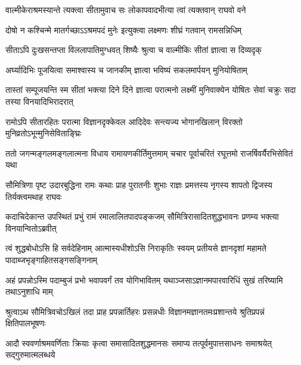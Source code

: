 \twolineshloka
{वाल्मीकेराश्रमस्यान्ते त्यक्त्वा सीतामुवाच सः}
{लोकापवादभीत्या त्वां त्यक्तवान् राघवो वने} %

\twolineshloka
{दोषो न कश्चिन्मे मातर्गच्छाऽऽश्रमपदं मुनेः}
{इत्युक्त्वा लक्ष्मणः शीघ्रं गतवान् रामसन्निधिम्} %

\twolineshloka
{सीताऽपि दुःखसन्तप्ता विललापातिमुग्धवत्}
{शिष्यैः श्रुत्वा च वाल्मीकिः सीतां ज्ञात्वा स दिव्यदृक्} %

\twolineshloka
{अर्घ्यादिभिः पूजयित्वा समाश्वास्य च जानकीम्}
{ज्ञात्वा भविष्यं सकलमार्पयन् मुनियोषिताम्} %

\threelineshloka
{तास्तां सम्पूजयन्ति स्म सीतां भक्त्या दिने दिने}
{ज्ञात्वा परात्मनो लक्ष्मीं मुनिवाक्येन योषितः}
{सेवां चक्रुः सदा तस्या विनयादिभिरादरात्} %

\fourlineindentedshloka
{रामोऽपि सीतारहितः परात्मा}
{विज्ञानदृक्केवल आदिदेवः}
{सन्त्यज्य भोगानखिलान् विरक्तो}
{मुनिव्रतोऽभून्मुनिसेविताङ्घ्रिः} %






\fourlineindentedshloka
{ततो जगन्मङ्गलमङ्गलात्मना}
{विधाय रामायणकीर्तिमुत्तमाम्}
{चचार पूर्वाचरितं रघूत्तमो}
{राजर्षिवर्यैरभिसेवितं यथा} %

\fourlineindentedshloka
{सौमित्रिणा पृष्ट उदारबुद्धिना}
{रामः कथाः प्राह पुरातनीः शुभाः}
{राज्ञः प्रमत्तस्य नृगस्य शापतो}
{द्विजस्य तिर्यक्त्वमथाह राघवः} %

\fourlineindentedshloka
{कदाचिदेकान्त उपस्थितं प्रभुं}
{रामं रमालालितपादपङ्कजम्}
{सौमित्रिरासादितशुद्धभावनः}
{प्रणम्य भक्त्या विनयान्वितोऽब्रवीत्} %

\fourlineindentedshloka
{त्वं शुद्धबोधोऽसि हि सर्वदेहिनाम्}
{आत्मास्यधीशोऽसि निराकृतिः स्वयम्}
{प्रतीयसे ज्ञानदृशां महामते}
{पादाब्जभृङ्गाहितसङ्गसङ्गिनाम्} %

\fourlineindentedshloka
{अहं प्रपन्नोऽस्मि पदाम्बुजं प्रभो}
{भवापवर्गं तव योगिभावितम्}
{यथाञ्जसाऽज्ञानमपारवारिधिं}
{सुखं तरिष्यामि तथाऽनुशाधि माम्} %

\fourlineindentedshloka
{श्रुत्वाऽथ सौमित्रिवचोऽखिलं तदा}
{प्राह प्रपन्नार्तिहरः प्रसन्नधीः}
{विज्ञानमज्ञानतमःप्रशान्तये}
{श्रुतिप्रपन्नं क्षितिपालभूषणः} %

\fourlineindentedshloka
{आदौ स्ववर्णाश्रमवर्णिताः क्रियाः}
{कृत्वा समासादितशुद्धमानसः}
{समाप्य तत्पूर्वमुपात्तसाधनः}
{समाश्रयेत् सद्गुरुमात्मलब्धये} %

